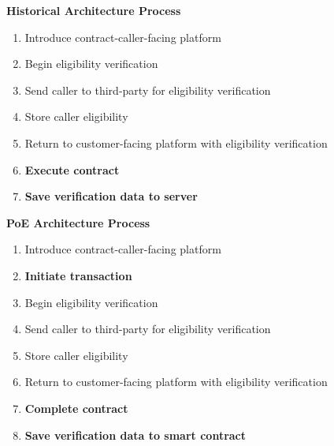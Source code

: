 \documentclass{article}
\begin{document}
\begin{multicols}{2}

\begin{center}
\textbf{Historical Architecture Process}
\end{center}
\begin{enumerate}
\item Introduce \Gls{contract-caller}-facing platform
\item Begin eligibility verification
\item Send caller to third-party for eligibility verification
\item Store caller eligibility
\item Return to customer-facing platform with eligibility verification
\item \textbf{Execute contract}
\item \textbf{Save verification data to server}
\end{enumerate}

\columnbreak

\begin{center}
\textbf{PoE Architecture Process}
\end{center}
\begin{enumerate}
\item Introduce \Gls{contract-caller}-facing platform
\item \textbf{Initiate transaction}
\item Begin eligibility verification
\item Send caller to third-party for eligibility verification
\item Store caller eligibility
\item Return to customer-facing platform with eligibility verification
\item \textbf{Complete contract}
\item \textbf{Save verification data to smart contract}
\end{enumerate}

\end{multicols}

\vfill
\end{document}
